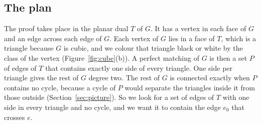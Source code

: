 \documentclass[10pt]{amsart}
\numberwithin{equation}{section}
\theoremstyle{definition}
\theoremstyle{remark}
\newcommand{\T}{T}
\begin{document}
\subsection*{The plan}
The proof takes place in the planar dual $\T$ of $G$.
It has a vertex in each face of $G$ and an edge across each edge of $G$.
Each vertex of $G$ lies in a face of $\T$, which is a triangle because $G$ is cubic, and we colour that triangle black or white by the class of the vertex (Figure~\ref{fig:cube}(b)).
A perfect matching of $G$ is then a set $P$ of edges of $\T$ that contains exactly one side of every triangle.
One side per triangle gives the rest of $G$ degree two.
The rest of $G$ is connected exactly when $P$ contains no cycle, because a cycle of $P$ would separate the triangles inside it from those outside (Section~\ref{sec:picture}).
So we look for a set of edges of $\T$ with one side in every triangle and no cycle, and we want it to contain the edge $e_0$ that crosses $e$.
\end{document}
